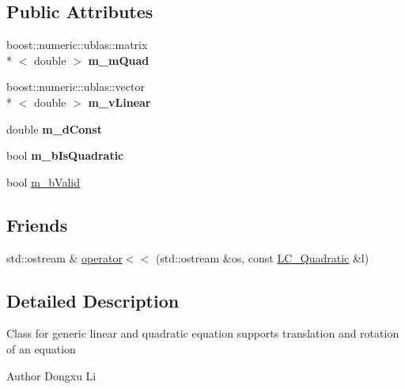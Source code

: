 \subsection*{Public Attributes}
\begin{DoxyCompactItemize}
\item 
\hypertarget{classLC__Quadratic_a485b9d66cbb8fa5d8ccd1cf876d25564}{boost\-::numeric\-::ublas\-::matrix\\*
$<$ double $>$ {\bfseries m\-\_\-m\-Quad}}\label{classLC__Quadratic_a485b9d66cbb8fa5d8ccd1cf876d25564}

\item 
\hypertarget{classLC__Quadratic_ac20242f9193959ea811bfc277b55c12c}{boost\-::numeric\-::ublas\-::vector\\*
$<$ double $>$ {\bfseries m\-\_\-v\-Linear}}\label{classLC__Quadratic_ac20242f9193959ea811bfc277b55c12c}

\item 
\hypertarget{classLC__Quadratic_a8ce531fe2bd02010f511f4d7a095e9aa}{double {\bfseries m\-\_\-d\-Const}}\label{classLC__Quadratic_a8ce531fe2bd02010f511f4d7a095e9aa}

\item 
\hypertarget{classLC__Quadratic_affa4aeda38e0c6173dfb1f411ac90534}{bool {\bfseries m\-\_\-b\-Is\-Quadratic}}\label{classLC__Quadratic_affa4aeda38e0c6173dfb1f411ac90534}

\item 
bool \hyperlink{classLC__Quadratic_ad55891a190d80c21ed2f570c64a42fac}{m\-\_\-b\-Valid}
\end{DoxyCompactItemize}
\subsection*{Friends}
\begin{DoxyCompactItemize}
\item 
std\-::ostream \& \hyperlink{classLC__Quadratic_a1d4f249f8743e3082ab033f2c8d20551}{operator$<$$<$} (std\-::ostream \&os, const \hyperlink{classLC__Quadratic}{L\-C\-\_\-\-Quadratic} \&l)
\end{DoxyCompactItemize}


\subsection{Detailed Description}
Class for generic linear and quadratic equation supports translation and rotation of an equation

\begin{DoxyAuthor}{Author}
Dongxu Li 
\end{DoxyAuthor}


